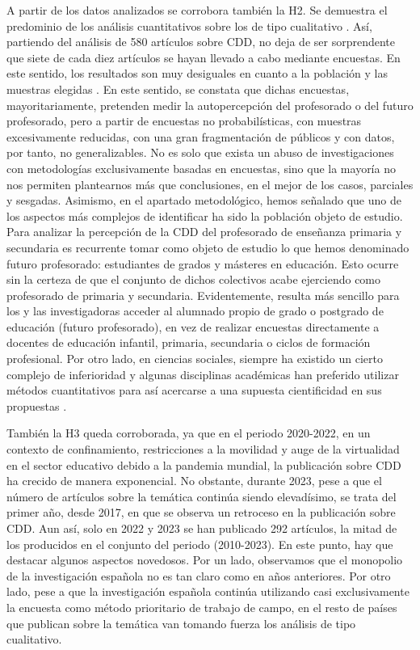 \documentclass[spanish]{textolivre}
\begin{document}
A partir de los datos analizados se corrobora también la H2. Se demuestra el predominio de los análisis cuantitativos sobre los de tipo cualitativo \cite{peters2022}. Así, partiendo del análisis de 580 artículos sobre CDD, no deja de ser sorprendente que siete de cada diez artículos se hayan llevado a cabo mediante encuestas. En este sentido, los resultados son muy desiguales en cuanto a la población y las muestras elegidas \cite{ballano2024, zhao2021}. En este sentido, se constata que dichas encuestas, mayoritariamente, pretenden medir la autopercepción del profesorado o del futuro profesorado, pero a partir de encuestas no probabilísticas, con muestras excesivamente reducidas, con una gran fragmentación de públicos y con datos, por tanto, no generalizables. No es solo que exista un abuso de investigaciones con metodologías exclusivamente basadas en encuestas, sino que la mayoría no nos permiten plantearnos más que conclusiones, en el mejor de los casos, parciales y sesgadas. Asimismo, en el apartado metodológico, hemos señalado que uno de los aspectos más complejos de identificar ha sido la población objeto de estudio. Para analizar la percepción de la CDD del profesorado de enseñanza primaria y secundaria es recurrente tomar como objeto de estudio lo que hemos denominado futuro profesorado: estudiantes de grados y másteres en educación. Esto ocurre sin la certeza de que el conjunto de dichos colectivos acabe ejerciendo como profesorado de primaria y secundaria. Evidentemente, resulta más sencillo para los y las investigadoras acceder al alumnado propio de grado o postgrado de educación (futuro profesorado), en vez de realizar encuestas directamente a docentes de educación infantil, primaria, secundaria o ciclos de formación profesional. Por otro lado, en ciencias sociales, siempre ha existido un cierto complejo de inferioridad y algunas disciplinas académicas han preferido utilizar métodos cuantitativos para así acercarse a una supuesta cientificidad en sus propuestas \cite{busquet2017}.

También la H3 queda corroborada, ya que en el periodo 2020-2022, en un contexto de confinamiento, restricciones a la movilidad y auge de la virtualidad en el sector educativo debido a la pandemia mundial, la publicación sobre CDD ha crecido de manera exponencial. No obstante, durante 2023, pese a que el número de artículos sobre la temática continúa siendo elevadísimo, se trata del primer año, desde 2017, en que se observa un retroceso en la publicación sobre CDD. Aun así, solo en 2022 y 2023 se han publicado 292 artículos, la mitad de los producidos en el conjunto del periodo (2010-2023). En este punto, hay que destacar algunos aspectos novedosos. Por un lado, observamos que el monopolio de la investigación española no es tan claro como en años anteriores. Por otro lado, pese a que la investigación española continúa utilizando casi exclusivamente la encuesta como método prioritario de trabajo de campo, en el resto de países que publican sobre la temática van tomando fuerza los análisis de tipo cualitativo. 
\end{document}
